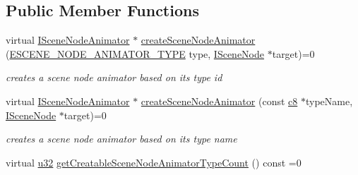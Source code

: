 \subsection*{Public Member Functions}
\begin{DoxyCompactItemize}
\item 
virtual \hyperlink{classirr_1_1scene_1_1ISceneNodeAnimator}{I\+Scene\+Node\+Animator} $\ast$ \hyperlink{classirr_1_1scene_1_1ISceneNodeAnimatorFactory_a509845a16fa1fdd7241bb10416327eb2}{create\+Scene\+Node\+Animator} (\hyperlink{namespaceirr_1_1scene_a327a1e43872705cf8f3f3342fb307d19}{E\+S\+C\+E\+N\+E\+\_\+\+N\+O\+D\+E\+\_\+\+A\+N\+I\+M\+A\+T\+O\+R\+\_\+\+T\+Y\+PE} type, \hyperlink{classirr_1_1scene_1_1ISceneNode}{I\+Scene\+Node} $\ast$target)=0
\begin{DoxyCompactList}\small\item\em creates a scene node animator based on its type id \end{DoxyCompactList}\item 
virtual \hyperlink{classirr_1_1scene_1_1ISceneNodeAnimator}{I\+Scene\+Node\+Animator} $\ast$ \hyperlink{classirr_1_1scene_1_1ISceneNodeAnimatorFactory_a093f1fb03d8e1c73ff60c8612b0ba778}{create\+Scene\+Node\+Animator} (const \hyperlink{namespaceirr_a9395eaea339bcb546b319e9c96bf7410}{c8} $\ast$type\+Name, \hyperlink{classirr_1_1scene_1_1ISceneNode}{I\+Scene\+Node} $\ast$target)=0
\begin{DoxyCompactList}\small\item\em creates a scene node animator based on its type name \end{DoxyCompactList}\item 
virtual \hyperlink{namespaceirr_a0416a53257075833e7002efd0a18e804}{u32} \hyperlink{classirr_1_1scene_1_1ISceneNodeAnimatorFactory_aaac2beca8e497141728477f993f55210}{get\+Creatable\+Scene\+Node\+Animator\+Type\+Count} () const  =0\hypertarget{classirr_1_1scene_1_1ISceneNodeAnimatorFactory_aaac2beca8e497141728477f993f55210}{}\label{classirr_1_1scene_1_1ISceneNodeAnimatorFactory_aaac2beca8e497141728477f993f55210}


\end{DoxyCompactItemize}
